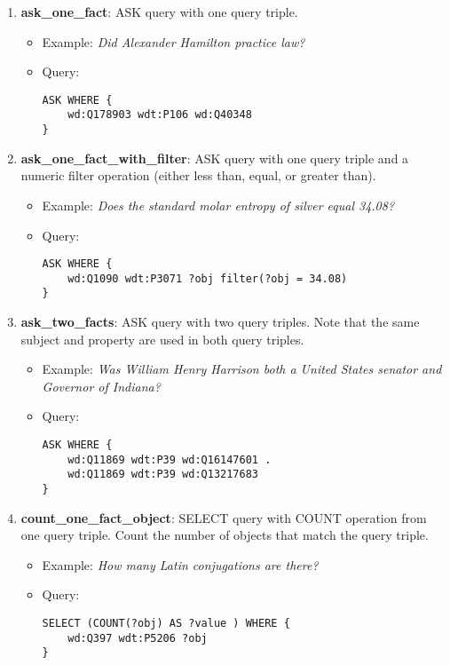 \begin{enumerate}
    \item \textbf{ask\_one\_fact}: ASK query with one query triple.
    \begin{itemize}
        \item Example: \textit{Did Alexander Hamilton practice law?}
        \item Query:
        \begin{lstlisting}[basicstyle=\ttfamily,frame=single]        
ASK WHERE { 
    wd:Q178903 wdt:P106 wd:Q40348 
}
        \end{lstlisting}
    \end{itemize}

    \item \textbf{ask\_one\_fact\_with\_filter}: ASK query with one query triple and a numeric filter 
    operation (either less than, equal, or greater than).
    \begin{itemize}
        \item Example: \textit{Does the standard molar entropy of silver equal 34.08?}
        \item Query:
        \begin{lstlisting}[basicstyle=\ttfamily,frame=single]        
ASK WHERE { 
    wd:Q1090 wdt:P3071 ?obj filter(?obj = 34.08) 
}
        \end{lstlisting}
    \end{itemize}

    \item \textbf{ask\_two\_facts}: ASK query with two query triples. Note that the same subject 
    and property are used in both query triples.
    \begin{itemize}
        \item Example: \textit{Was William Henry Harrison both a United States senator and Governor of 
        Indiana?}
        \item Query:
        \begin{lstlisting}[basicstyle=\ttfamily,frame=single]        
ASK WHERE { 
    wd:Q11869 wdt:P39 wd:Q16147601 . 
    wd:Q11869 wdt:P39 wd:Q13217683 
}
        \end{lstlisting}
    \end{itemize}

    \item \textbf{count\_one\_fact\_object}: SELECT query with COUNT operation from one query triple. 
    Count the number of objects that match the query triple.
    \begin{itemize}
        \item Example: \textit{How many Latin conjugations are there?}
        \item Query:
        \begin{lstlisting}[basicstyle=\ttfamily,frame=single]        
SELECT (COUNT(?obj) AS ?value ) WHERE { 
    wd:Q397 wdt:P5206 ?obj 
}
        \end{lstlisting}
    \end{itemize}


\end{enumerate}
